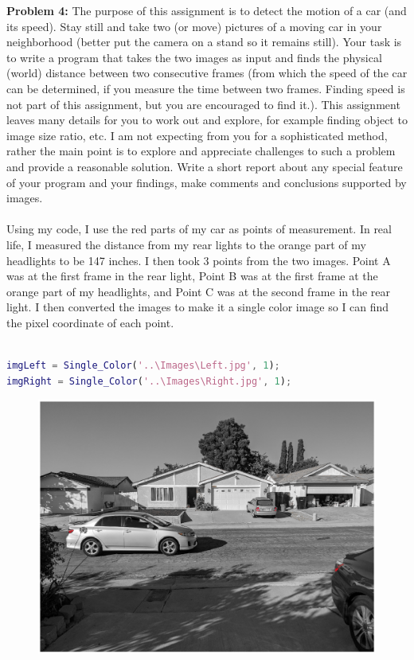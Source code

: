 \documentclass[11pt]{article}
\newenvironment{problem}[1]{\textbf{Problem #1: }}{\newpage}
\begin{document}
	\begin{problem}{4}
		The purpose of this assignment is to detect the motion of a car (and its speed). Stay still and take two (or move) pictures of a moving car in your neighborhood (better put the camera on a stand so it remains still). Your task is to write a program that takes the two images as input and finds the physical (world) distance between two consecutive frames (from which the speed of the car can be determined, if you measure the time between two frames. Finding speed is not part of this assignment, but you are encouraged to find it.).  This assignment leaves many details for you to work out and explore, for example finding object to image size ratio, etc. I am not expecting from you for a sophisticated method, rather the main point is to explore and appreciate challenges to such a problem and provide a reasonable solution. 
		Write a short report about any special feature of your program and  your findings, make comments and conclusions supported by images. 
		\\ \\
		Using my code, I use the red parts of my car as points of measurement. In real life, I measured the distance from my rear lights to the orange part of my headlights to be 147 inches.  I then took 3 points from the two images.  Point A was at the first frame in the rear light, Point B was at the first frame at the orange part of my headlights, and Point C was at the second frame in the rear light.   I then converted the images to make it a single color image so I can find the pixel coordinate of each point. 
		\\ \\ 
\begin{lstlisting}[language = Matlab]
imgLeft = Single_Color('..\Images\Left.jpg', 1);
imgRight = Single_Color('..\Images\Right.jpg', 1);
\end{lstlisting}
		\begin{figure}[h!]
			\centering
			\includegraphics[width = 8.cm]{Images/LeftSingle}

\end{figure}
\end{problem}
\end{document}
